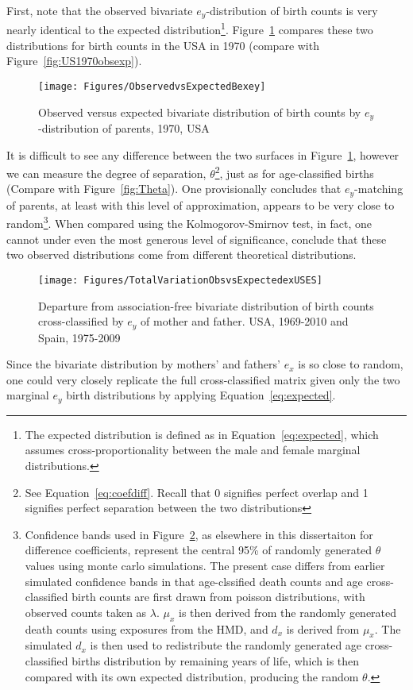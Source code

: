  \FloatBarrier
\label{sec:exobsexpected}
First, note that the observed bivariate $e_y$-distribution of birth counts is
very nearly identical to the expected distribution\footnote{The expected
distribution is defined as in Equation~\eqref{eq:expected}, which assumes
cross-proportionality between the male and female marginal distributions.}.
Figure~\ref{fig:US1970obsexpex} compares these two distributions for 
birth counts in the USA in 1970 (compare with Figure~\ref{fig:US1970obsexp}). 

\begin{figure}[ht!]
        \centering  
          \caption{Observed versus expected bivariate distribution of birth
          counts by $e_y$-distribution of parents, 1970, USA}
           \texttt{[image: Figures/ObservedvsExpectedBexey]}
          \label{fig:US1970obsexpex}
\end{figure}

It is
difficult to see any difference between the two surfaces in
Figure~\ref{fig:US1970obsexpex}, however we can measure the degree of
separation, $\theta$\footnote{See Equation~\eqref{eq:coefdiff}. Recall that 0 signifies
perfect overlap and 1 signifies perfect separation between the two
distributions}, just as for age-classified births (Compare with
Figure~\ref{fig:Theta}). One provisionally concludes that $e_y$-matching of
parents, at least with this level of approximation, appears to be very close to
random\footnote{Confidence bands used in Figure~\ref{fig:TotalVarobsexpex}, as
elsewhere in this dissertaiton for difference coefficients, represent the
central 95\% of randomly generated $\theta$ values using monte carlo
simulations. The present case differs from earlier simulated confidence bands in
that age-clssified death counts and age cross-classified birth counts 
are first drawn from poisson distributions, with
observed counts taken as $\lambda$. $\mu_x$ is then derived from the randomly
generated death counts using exposures from the HMD, and $d_x$ is derived from
$\mu_x$. The simulated $d_x$ is then used to redistribute the randomly generated
age cross-classified births distribution by remaining years of life, which is
then compared with its own expected distribution, producing the random $\theta$.}. 
When compared using the
Kolmogorov-Smirnov test, in fact, one cannot under even the most generous level
of significance, conclude that these two observed distributions come from
different theoretical distributions.

\begin{figure}[ht!]
        \centering  
          \caption{Departure from association-free bivariate distribution of
          birth counts cross-classified by $e_y$ of mother and father. USA,
          1969-2010 and Spain, 1975-2009}
           \texttt{[image: Figures/TotalVariationObsvsExpectedexUSES]}
          \label{fig:TotalVarobsexpex}
\end{figure}

Since the bivariate distribution by mothers' and fathers' $e_x$ is so close
to random, one could very closely replicate the full cross-classified matrix 
given only the two marginal
$e_y$ birth distributions by applying Equation~\eqref{eq:expected}. 

\FloatBarrier